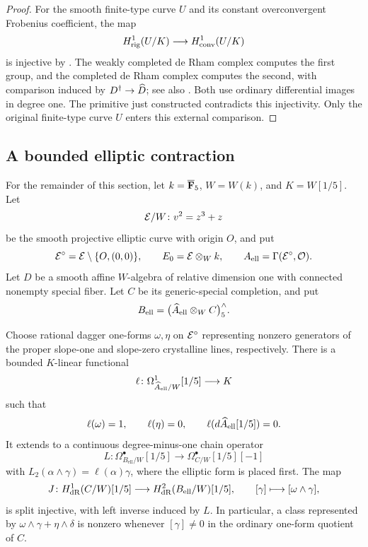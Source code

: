 \begin{proof}
For the smooth finite-type curve \(U\) and its constant overconvergent
Frobenius coefficient, the map
\[
 H^1_{\mathrm{rig}}(U/K)\longrightarrow H^1_{\mathrm{conv}}(U/K)
\]
is injective by \cite[Theorem~3.2.1]{CaroDAddezio2025}.
The weakly completed de Rham complex computes the first group, and
the completed de Rham complex computes the second, with comparison
induced by \(D^\dagger\to\widehat D\);
see also \cite[Theorem~2.1.2]{CaroDAddezio2025}.
Both use ordinary differential images in degree one.
The primitive just constructed contradicts this injectivity.
Only the original finite-type curve \(U\) enters this external
comparison.
\end{proof}

\subsection{A bounded elliptic contraction}

\begin{setup}\label{d2:setup:elliptic}
For the remainder of this section, let
\(k=\overline{\mathbf{F}}_5\), \(W=W(k)\), and \(K=W[1/5]\).
Let
\[
 \mathcal E/W\colon v^2=z^3+z
\]
be the smooth projective elliptic curve with origin \(O\), and put
\[
 \mathcal E^\circ=\mathcal E\setminus\{O,(0,0)\},
 \qquad
 E_0=\mathcal E\otimes_Wk,
 \qquad
 A_{\mathrm{ell}}=\Gamma(\mathcal E^\circ,\mathcal O).
\]
Let \(D\) be a smooth affine \(W\)-algebra of relative dimension one
with connected nonempty special fiber. Let \(C\) be its
generic-special completion, and put
\[
 B_{\mathrm{ell}}=
 \bigl(\widehat A_{\mathrm{ell}}\otimes_WC\bigr)^\wedge_5.
\]
\end{setup}

\begin{proposition}\label{d2:prop:contraction}
Choose rational dagger one-forms \(\omega,\eta\) on
\(\mathcal E^\circ\) representing nonzero generators of the proper
slope-one and slope-zero crystalline lines, respectively.
There is a bounded \(K\)-linear functional
\[
 \ell\colon\Omega^1_{\widehat A_{\mathrm{ell}}/W}[1/5]\longrightarrow K
\]
such that
\[
 \ell(\omega)=1,\qquad
 \ell(\eta)=0,\qquad
 \ell(d\widehat A_{\mathrm{ell}}[1/5])=0.
\]
It extends to a continuous degree-minus-one chain operator
\[
 L\colon\Omega^\bullet_{B_{\mathrm{ell}}/W}[1/5]
       \longrightarrow\Omega^\bullet_{C/W}[1/5][-1]
\]
with \(L_2(\alpha\wedge\gamma)=\ell(\alpha)\gamma\), where the
elliptic form is placed first.
The map
\[
 J\colon H^1_{\mathrm{dR}}(C/W)[1/5]\longrightarrow
          H^2_{\mathrm{dR}}(B_{\mathrm{ell}}/W)[1/5],
 \qquad [\gamma]\longmapsto[\omega\wedge\gamma],
\]
is split injective, with left inverse induced by \(L\).
In particular, a class represented by
\(\omega\wedge\gamma+\eta\wedge\delta\) is nonzero whenever
\([\gamma]\ne0\) in the ordinary one-form quotient of \(C\).
\end{proposition}

